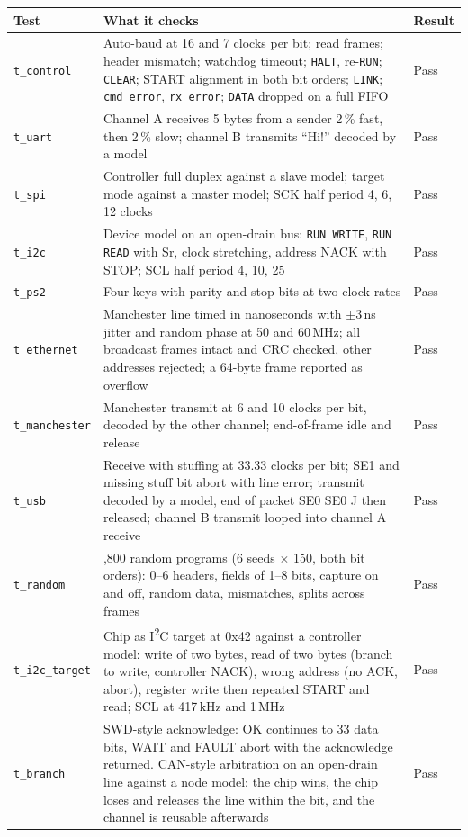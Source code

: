 \documentclass[11pt,a4paper]{article}
\newcommand{\sig}[1]{\texttt{#1}}
\begin{document}
\begin{longtable}{@{}>{\raggedright\arraybackslash}p{2.6cm} >{\raggedright\arraybackslash}p{12.2cm} l@{}}
\toprule
Test & What it checks & Result \\
\midrule
\endhead
\sig{t\_control} & Auto-baud at 16 and 7 clocks per bit; read frames; header mismatch; watchdog timeout; \sig{HALT}, re-\sig{RUN}; \sig{CLEAR}; START alignment in both bit orders; \sig{LINK}; \sig{cmd\_error}, \sig{rx\_error}; \sig{DATA} dropped on a full FIFO & Pass \\
\sig{t\_uart} & Channel A receives 5 bytes from a sender 2\,\% fast, then 2\,\% slow; channel B transmits ``Hi!'' decoded by a model & Pass \\
\sig{t\_spi} & Controller full duplex against a slave model; target mode against a master model; SCK half period 4, 6, 12 clocks & Pass \\
\sig{t\_i2c} & Device model on an open-drain bus: \sig{RUN WRITE}, \sig{RUN READ} with Sr, clock stretching, address NACK with STOP; SCL half period 4, 10, 25 & Pass \\
\sig{t\_ps2} & Four keys with parity and stop bits at two clock rates & Pass \\
\sig{t\_ethernet} & Manchester line timed in nanoseconds with $\pm$3\,ns jitter and random phase at 50 and 60\,MHz; all broadcast frames intact and CRC checked, other addresses rejected; a 64-byte frame reported as overflow & Pass \\
\sig{t\_manchester} & Manchester transmit at 6 and 10 clocks per bit, decoded by the other channel; end-of-frame idle and release & Pass \\
\sig{t\_usb} & Receive with stuffing at 33.33 clocks per bit; SE1 and missing stuff bit abort with line error; transmit decoded by a model, end of packet SE0 SE0 J then released; channel B transmit looped into channel A receive & Pass \\
\sig{t\_random} & 1,800 random programs (6 seeds $\times$ 150, both bit orders): 0--6 headers, fields of 1--8 bits, capture on and off, random data, mismatches, splits across frames & Pass \\
\sig{t\_i2c\_target} & Chip as I\textsuperscript{2}C target at 0x42 against a controller model: write of two bytes, read of two bytes (branch to write, controller NACK), wrong address (no ACK, abort), register write then repeated START and read; SCL at 417\,kHz and 1\,MHz & Pass \\
\sig{t\_branch} & SWD-style acknowledge: OK continues to 33 data bits, WAIT and FAULT abort with the acknowledge returned. CAN-style arbitration on an open-drain line against a node model: the chip wins, the chip loses and releases the line within the bit, and the channel is reusable afterwards & Pass \\

\end{longtable}
\end{document}
